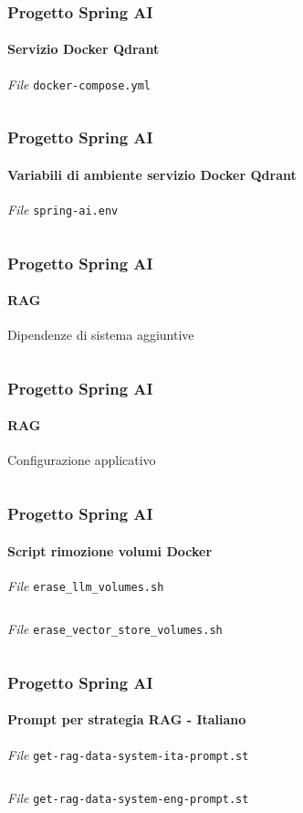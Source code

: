 %
\begin{frame}[t,fragile] \frametitle{Progetto Spring AI}
    \framesubtitle{Servizio Docker Qdrant}
        \begin{block}{\textit{File} \texttt{docker-compose.yml}}
			{\tiny\inputminted{yaml}{code/docker-compose.yml}}
    	\end{block}
\end{frame}
%
\begin{frame}[t,fragile] \frametitle{Progetto Spring AI}
    \framesubtitle{Variabili di ambiente servizio Docker Qdrant}
        \begin{block}{\textit{File} \texttt{spring-ai.env}}
			{\tiny\inputminted{text}{code/spring-ai.env}}
    	\end{block}
\end{frame}
%
\begin{frame}[t,fragile] \frametitle{Progetto Spring AI}
    \framesubtitle{RAG}
        \begin{block}{Dipendenze di sistema aggiuntive}
			{\tiny\inputminted{xml}{code/pom.xml}}
    	\end{block}
\end{frame}
%
\begin{frame}[t,fragile] \frametitle{Progetto Spring AI}
    \framesubtitle{RAG}
        \begin{block}{Configurazione applicativo}
			{\tiny\inputminted{yaml}{code/application.yml}}
    	\end{block}
\end{frame}
%
\begin{frame}[t,fragile] \frametitle{Progetto Spring AI}
    \framesubtitle{Script rimozione volumi Docker}
        \begin{block}{\textit{File} \texttt{erase\_llm\_volumes.sh}}
			{\tiny\inputminted{bash}{code/erase_llm_volumes.sh}}
    	\end{block}
        \begin{block}{\textit{File} \texttt{erase\_vector\_store\_volumes.sh}}
			{\tiny\inputminted{bash}{code/erase_vector_store_volumes.sh}}
    	\end{block}
\end{frame}
%
\begin{frame}[t,fragile] \frametitle{Progetto Spring AI}
    \framesubtitle{Prompt per strategia RAG - Italiano}
        \begin{block}{\textit{File} \texttt{get-rag-data-system-ita-prompt.st}}
			{\scriptsize\inputminted{text}{code/get-rag-data-system-ita-prompt.st}}
    	\end{block}
        \vspace*{.3cm}
        \begin{block}{\textit{File} \texttt{get-rag-data-system-eng-prompt.st}}
			{\scriptsize\inputminted{text}{code/get-rag-data-system-eng-prompt.st}}
    	\end{block}
\end{frame}

